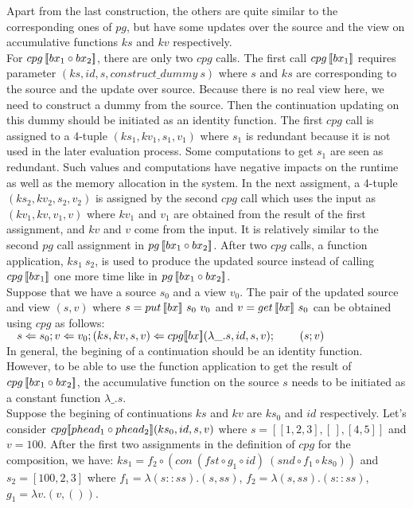 Apart from the last construction, the others are quite similar to the corresponding ones of $pg$, but have some updates over the source and the view on accumulative functions $ks$ and $kv$ respectively.\\
For $cpg \, [\![bx_1 \circ bx_2]\!]$, there are only two $cpg$ calls. The first call $cpg \, [\![bx_1]\!]$ requires parameter $(ks, id, s, construct\_dummy \ s)$ where $s$ and $ks$ are corresponding to the source and the update over source. Because there is no real view here, we need to construct a dummy from the source. Then the continuation updating on this dummy should be initiated as an identity function. The first $cpg$ call is assigned to a 4-tuple $(ks_1, kv_1, s_1, v_1)$ where $s_1$ is redundant because it is not used in the later evaluation process. Some computations to get $s_1$ are seen as redundant. Such values and computations have negative impacts on the runtime as well as the memory allocation in the system. In the next assigment, a 4-tuple $(ks_2, kv_2, s_2, v_2)$ is assigned by the second $cpg$ call which uses the input as $(kv_1, kv, v_1, v)$ where $kv_1$ and $v_1$ are obtained from the result of the first assignment, and $kv$ and $v$ come from the input. It is relatively similar to the second $pg$ call assignment in $pg \, [\![bx_1 \circ bx_2]\!]$. After two $cpg$ calls, a function application, $ks_1 \ s_2$, is used to produce the updated source instead of calling $cpg \, [\![bx_1]\!]$ one more time like in $pg \, [\![bx_1 \circ bx_2]\!]$.\\
Suppose that we have a source $s_0$ and a view $v_0$. The pair of the updated source and view $(s, v)$ where $s = put \, [\![bx]\!] \ s_0 \ v_0$ and $v = get \, [\![bx]\!] \ s_0$ can be obtained using $cpg$ as follows:\\
    $\hspace*{3mm} s \Leftarrow s_0; v \Leftarrow v_0; (ks, kv, s, v) \Leftarrow cpg [\![bx]\!] (\lambda \_.s, id, s, v);\\
        \hspace*{3mm} \ \quad (s; v)$\\
In general, the begining of a continuation should be an identity function. However, to be able to use the function application to get the result of $cpg \, [\![bx_1 \circ bx_2]\!]$, the accumulative function on the source $s$ needs to be initiated as a constant function $\lambda \_.s$.\\
Suppose the begining of continuations $ks$ and $kv$ are $ks_0$ and $id$ respectively. Let's consider $cpg [\![phead_1 \circ phead_2]\!] (ks_0, id, s, v)$ where $s = [[1,2,3], [\,], [4,5]]$ and $v = 100$. After the first two assignments in the definition of $cpg$ for the composition, we have: $ks_1 = f_2 \circ (con \ (fst \circ g_1 \circ id) \ (snd \circ f_1 \circ ks_0))$ and $s_2 = [100,2,3]$ where $f_1 = \lambda (s::ss).(s,ss)$, $f_2 = \lambda (s,ss).(s::ss)$, $g_1 = \lambda v.(v,())$. \\
